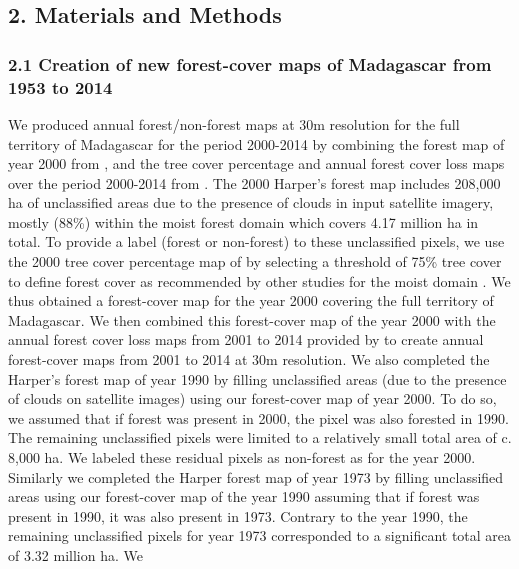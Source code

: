 \documentclass[]{article}
\begin{document}
\hypertarget{materials-and-methods}{%
\subsection{2. Materials and Methods}\label{materials-and-methods}}

\hypertarget{creation-of-new-forest-cover-maps-of-madagascar-from-1953-to-2014}{%
\subsubsection{2.1 Creation of new forest-cover maps of Madagascar from
1953 to
2014}\label{creation-of-new-forest-cover-maps-of-madagascar-from-1953-to-2014}}

We produced annual forest/non-forest maps at 30m resolution for the full
territory of Madagascar for the period 2000-2014 by combining the forest
map of year 2000 from \citet{Harper2007}, and the tree cover percentage
and annual forest cover loss maps over the period 2000-2014 from
\citet{Hansen2013}. The 2000 Harper's forest map includes 208,000 ha of
unclassified areas due to the presence of clouds in input satellite
imagery, mostly (88\%) within the moist forest domain which covers 4.17
million ha in total. To provide a label (forest or non-forest) to these
unclassified pixels, we use the 2000 tree cover percentage map of
\citet{Hansen2013} by selecting a threshold of 75\% tree cover to define
forest cover as recommended by other studies for the moist domain
\citep{Achard2014}. We thus obtained a forest-cover map for the year
2000 covering the full territory of Madagascar. We then combined this
forest-cover map of the year 2000 with the annual forest cover loss maps
from 2001 to 2014 provided by \citet{Hansen2013} to create annual
forest-cover maps from 2001 to 2014 at 30m resolution. We also completed
the Harper's forest map of year 1990 by filling unclassified areas (due
to the presence of clouds on satellite images) using our forest-cover
map of year 2000. To do so, we assumed that if forest was present in
2000, the pixel was also forested in 1990. The remaining unclassified
pixels were limited to a relatively small total area of c. 8,000 ha. We
labeled these residual pixels as non-forest as for the year 2000.
Similarly we completed the Harper forest map of year 1973 by filling
unclassified areas using our forest-cover map of the year 1990 assuming
that if forest was present in 1990, it was also present in 1973.
Contrary to the year 1990, the remaining unclassified pixels for year
1973 corresponded to a significant total area of 3.32 million ha. We
\end{document}
